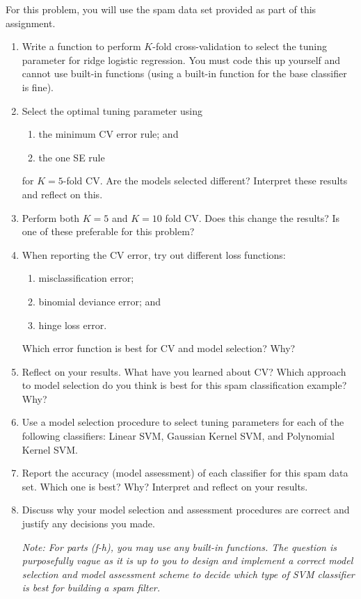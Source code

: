 \documentclass[10pt]{article}
\begin{document}
For this problem, you will use the spam data set provided as part of this assignment. 
\begin{enumerate}[label={(\alph*)}]
\item Write a function to perform $K$-fold cross-validation to select
  the tuning parameter for ridge logistic regression. You must code this up
  yourself and cannot use built-in functions (using a built-in
  function for the base classifier is fine).
\item Select the optimal tuning parameter using
  \begin{enumerate}[label={(\arabic*)}]
  \item the minimum CV error rule; and
  \item the one SE rule
  \end{enumerate}
  for $K=5$-fold CV. Are the models selected different? Interpret
  these results and reflect on this.
\item Perform both $K=5$ and $K=10$ fold CV. Does this change the
  results? Is one of these preferable for this problem?
\item When reporting the CV error, try out different loss functions:
  \begin{enumerate}[label={(\arabic*)}]
  \item misclassification error;
  \item binomial deviance error; and
  \item hinge loss error.
  \end{enumerate} Which error function is best for CV and model
  selection? Why?
\item Reflect on your results. What have you learned about CV? Which
  approach to model selection do you think is best for this spam
  classification example? Why?
\item Use a model selection procedure to select tuning parameters for
  each of the following classifiers: Linear SVM, Gaussian Kernel SVM,
  and Polynomial Kernel SVM.
\item Report the accuracy (model assessment) of each classifier for
  this spam data set. Which one is best? Why? Interpret and reflect on
  your results.
\item Discuss why your model selection and assessment procedures are
  correct and justify any decisions you made.

  \emph{Note: For parts (f-h), you may use any built-in functions. The
  question is purposefully vague as it is up to you to design and
  implement a correct model selection and model assessment scheme to
  decide which type of SVM classifier is best for building a spam
  filter.}
\end{enumerate}
\end{document}
